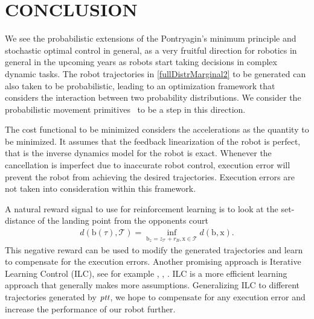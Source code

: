 \documentclass[letterpaper, 10 pt, conference]{ieeeconf}
\newcommand{\boldvec}[1]{\boldsymbol{\mathrm{#1}}}
\let\vec\boldvec
\newcommand{\alg}{\emph{ptt}} %
\newcommand{\ball}{\vec{b}} %
\newcommand{\ballRadius}{r_B}
\newcommand{\court}{\mathcal{T}} %
\newcommand{\landTime}{\tau} %
\begin{document}

\section{CONCLUSION}\label{end}

We see the probabilistic extensions of the Pontryagin's minimum principle \cite{Liberzon11} and stochastic optimal control in general, as a very fruitful direction for robotics in general in the upcoming years as robots start taking decisions in complex dynamic tasks. The robot trajectories in \eqref{fullDistrMarginal2} to be generated can also taken to be probabilistic, leading to an optimization framework that considers the interaction between two probability distributions. We consider the probabilistic movement primitives~\cite{Paraschos13} to be a step in this direction.


The cost functional to be minimized considers the accelerations as the quantity to be minimized. It assumes that the feedback linearization of the robot is perfect, that is the inverse dynamics model for the robot is exact. Whenever the cancellation is imperfect due to inaccurate robot control, execution error will prevent the robot from achieving the desired trajectories. Execution errors are not taken into consideration within this framework. 

A natural reward signal to use for reinforcement learning is to look at the set-distance of the landing point from the opponents court
%
\begin{align}
d(\ball(\landTime),\court) = \inf_{\ball_z = z_{\court} + \ballRadius, \vec{x} \in \court} d(\ball,\vec{x}).
\end{align}
%
\noindent This negative reward can be used to modify the generated trajectories and learn to compensate for the execution errors. Another promising approach is Iterative Learning Control (ILC), see for example \cite{Bristow06}, \cite{Longman2000}, \cite{Koc15}. ILC is a more efficient learning approach that generally makes more assumptions. Generalizing ILC to different trajectories generated by $\alg$, we hope to compensate for any execution error and increase the performance of our robot further. 


%
%

\end{document}
